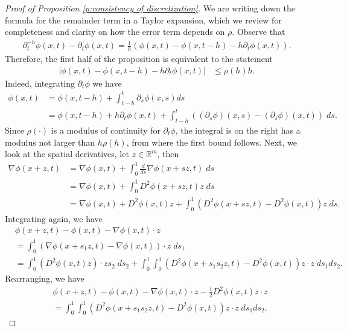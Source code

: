 \documentclass[reqno]{amsart}
\numberwithin{equation}{section}
\begin{document}
\begin{proof}[Proof of Proposition \ref{p:consistency of discretization}]

  We are  writing down the formula for the remainder term in a Taylor expansion, which we review for completeness and clarity on how the error term depends on $\rho$. Observe that
  \begin{align*}
    \partial_t^{-h}\phi(x,t)-\partial_t\phi(x,t)= \tfrac{1}{h}(\phi(x,t)-\phi(x,t-h)-h\partial_t \phi(x,t)).    
  \end{align*} 
  Therefore, the first half of the proposition is equivalent to the statement
  \begin{align*}
    |\phi(x,t)-\phi(x,t-h)-h\partial_t \phi(x,t)| & \leq \rho(h)h.
  \end{align*}
  Indeed, integrating $\partial_t \phi$ we have
  \begin{align*}
    \phi(x,t) & = \phi(x,t-h) + \int_{t-h}^t \partial_s \phi(x,s) ds\\
      & =  \phi(x,t-h) + h \partial_t\phi(x,t) + \int_{t-h}^t ((\partial_s \phi)(x,s)-(\partial_s \phi)(x,t))\;ds.
  \end{align*}
  Since $\rho(\cdot)$ is a modulus of continuity for $\partial_t \phi$, the integral is on the right has a modulus not larger than $h \rho(h)$, from where the first bound follows.  Next, we look at the spatial derivatives, let $z \in \mathbb{R}^m$, then 
  \begin{align*}
    \nabla \phi(x+z,t) & = \nabla \phi(x,t)+\int_0^1\frac{d}{ds}\nabla \phi(x+sz,t)\;ds\\
      & = \nabla \phi(x,t)+ \int_0^1 D^2\phi(x+sz,t) z\;ds\\
      & = \nabla \phi(x,t)+ D^2\phi(x,t)z + \int_0^1 (D^2\phi(x+sz,t)-D^2\phi(x,t))z\;ds.
  \end{align*}
  Integrating again, we have
  \begin{align*}
    & \phi(x+ z,t)-\phi(x,t)-\nabla \phi(x,t)\cdot z\\
    & = \int_0^1 (\nabla \phi(x+s_1z,t)-\nabla \phi(x,t))\cdot z\;ds_1\\
    & = \int_0^1 (D^2\phi(x,t)z)\cdot z s_2\;ds_2+\int_0^1\int_0^1 (D^2\phi(x+s_1s_2z,t)-D^2\phi(x,t))z\cdot z\;ds_1ds_2.
  \end{align*}
  Rearranging, we have 
  \begin{align*}
    & \phi(x+ z,t)-\phi(x,t)-\nabla \phi(x,t)\cdot z-\tfrac{1}{2}D^2\phi(x,t)z\cdot z\\
    & = \int_0^1\int_0^1 (D^2\phi(x+s_1s_2z,t)-D^2\phi(x,t))z\cdot z\;ds_1ds_2.

\end{align*}
\end{proof}
\end{document}
